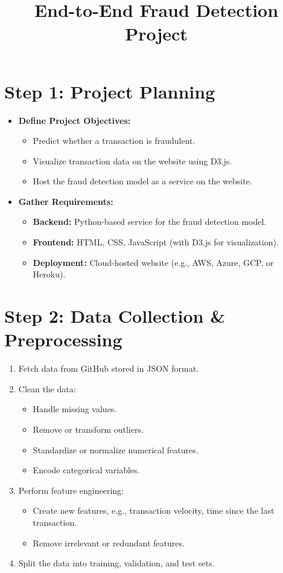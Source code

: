 \documentclass[12pt]{article}
\title{End-to-End Fraud Detection Project}
\author{}
\date{}
\begin{document}
\maketitle

\section*{Step 1: Project Planning}
\begin{itemize}
    \item \textbf{Define Project Objectives:}
    \begin{itemize}
        \item Predict whether a transaction is fraudulent.
        \item Visualize transaction data on the website using D3.js.
        \item Host the fraud detection model as a service on the website.
    \end{itemize}
    \item \textbf{Gather Requirements:}
    \begin{itemize}
        \item \textbf{Backend:} Python-based service for the fraud detection model.
        \item \textbf{Frontend:} HTML, CSS, JavaScript (with D3.js for visualization).
        \item \textbf{Deployment:} Cloud-hosted website (e.g., AWS, Azure, GCP, or Heroku).
    \end{itemize}
\end{itemize}

\section*{Step 2: Data Collection \& Preprocessing}
\begin{enumerate}
    \item Fetch data from GitHub stored in JSON format.
    \item Clean the data:
    \begin{itemize}
        \item Handle missing values.
        \item Remove or transform outliers.
        \item Standardize or normalize numerical features.
        \item Encode categorical variables.
    \end{itemize}
    \item Perform feature engineering:
    \begin{itemize}
        \item Create new features, e.g., transaction velocity, time since the last transaction.
        \item Remove irrelevant or redundant features.
    \end{itemize}
    \item Split the data into training, validation, and test sets.
\end{enumerate}
\end{document}
